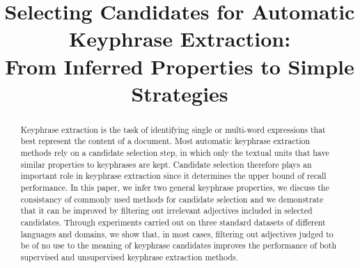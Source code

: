 \documentclass[11pt]{article}
\title{Selecting Candidates for Automatic Keyphrase Extraction:\\
       From Inferred Properties to Simple Strategies}
\date{}
\begin{document}
  \maketitle
  \begin{abstract}
    Keyphrase extraction is the task of identifying single or multi-word
    expressions that best represent the content of a document. Most automatic
    keyphrase extraction methods rely on a candidate selection step, in which
    only the textual units that have similar properties to keyphrases are kept.
    Candidate selection therefore plays an important role in keyphrase
    extraction since it determines the upper bound of recall performance. In
    this paper, we infer two general keyphrase properties, we discuss the
    consistancy of commonly used methods for candidate selection and we
    demonstrate that it can be improved by filtering out irrelevant adjectives
    included in selected candidates. Through experiments carried out on three
    standard datasets of different languages and domains, we show that, in most
    cases, filtering out adjectives judged to be of no use to the meaning of
    keyphrase candidates improves the performance of both supervised and
    unsupervised keyphrase extraction methods.
  \end{abstract}

  


  
  
\end{document}
